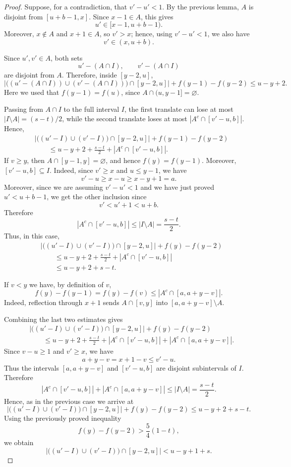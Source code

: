 \documentclass[11pt,reqno]{amsart}
\theoremstyle{definition}
\def\F#1{f(#1)}
\begin{document}
\begin{proof}
Suppose, for a contradiction, that $v'-u'<1$. By the previous lemma, $A$ is
disjoint from $[u+b-1,x]$. Since $x-1\in A$, this gives
$$
    u'\in [x-1,u+b-1).
$$
Moreover, $x\notin A$ and $x+1\in A$, so $v'>x$; hence, using
$v'-u'<1$, we also have
$$
    v'\in (x,u+b).
$$

Since $u',v'\in A$, both sets
$$
    u'-(A\cap I),
    \qquad
    v'-(A\cap I)
$$
are disjoint from $A$. Therefore, inside $[y-2,u]$,
$$
    \left| \bigl((u'-(A\cap I))\cup(v'-(A\cap I))\bigr)\cap[y-2,u]\right|
    +\F{y-1}-\F{y-2}
    \leq u-y+2.
$$
Here we used that $\F{y-1}=\F{u}$, since $A\cap(u,y-1]=\varnothing$.

Passing from $A\cap I$ to the full interval $I$, the first translate can lose
at most $|I\setminus A|=(s-t)/2$, while the second translate loses at most
$|A^c\cap[v'-u,b]|$. Hence,  
$$
\begin{aligned}
    &\left| \bigl((u'-I)\cup(v'-I)\bigr)\cap[y-2,u]\right|
    +\F{y-1}-\F{y-2} \\
    &\qquad\leq
    u-y+2+\frac{s-t}{2}+|A^c\cap[v'-u,b]|.
\end{aligned}
$$
If $v\geq y$, then $A\cap[y-1,y]=\varnothing$, and hence $\F{y}=\F{y-1}$. Moreover, $[v'-u,b]\subseteq I$. Indeed, since $v'\geq x$ and
$u\leq y-1$, we have
$$
    v'-u\geq x-u\geq x-y+1=a.
$$
Moreover, since we are assuming $v'-u'<1$ and we have just proved
$u'<u+b-1$, we get the other inclusion since
$$
    v'<u'+1<u+b.
$$
Therefore
$$
    |A^c\cap [v'-u,b]|
    \leq |I\setminus A|
    =
    \frac{s-t}{2}.
$$
Thus, in this case,
$$
\begin{aligned}
    &\left|
        \bigl((u'-I)\cup(v'-I)\bigr)\cap [y-2,u]
    \right|
    +\F{y}-\F{y-2}  \\
    &\qquad\leq
    u-y+2+\frac{s-t}{2}+|A^c\cap [v'-u,b]|  \\
    &\qquad\leq
    u-y+2+s-t.
\end{aligned}
$$

If $v<y$ we have, by definition of $v$,
$$
    \F{y}-\F{y-1}=\F{y}-\F{v}\leq |A^c\cap[a,a+y-v]|.
$$
Indeed, reflection through $x+1$ sends $A\cap[v,y]$ into
$[a,a+y-v]\setminus A$.

Combining the last two estimates gives
$$
\begin{aligned}
    &\left| \bigl((u'-I)\cup(v'-I)\bigr)\cap[y-2,u]\right|
    +\F{y}-\F{y-2} \\
    &\qquad\leq
    u-y+2+\frac{s-t}{2}
    +|A^c\cap[v'-u,b]|+|A^c\cap[a,a+y-v]|.
\end{aligned}
$$
Since $v-u\geq1$ and $v'\geq x$, we have
$$
    a+y-v=x+1-v\leq v'-u.
$$
Thus the intervals $[a,a+y-v]$ and $[v'-u,b]$ are disjoint subintervals of
$I$. Therefore
$$
    |A^c\cap[v'-u,b]|+|A^c\cap[a,a+y-v]|
    \leq |I\setminus A|
    =
    \frac{s-t}{2}.
$$
Hence, as in the previous case we arrive at
$$
    \left| \bigl((u'-I)\cup(v'-I)\bigr)\cap[y-2,u]\right|
    +\F{y}-\F{y-2}
    \leq u-y+2+s-t.
$$
Using the previously proved inequality
$$
    \F{y}-\F{y-2}>\frac54(1-t),
$$
we obtain
$$
    \left| \bigl((u'-I)\cup(v'-I)\bigr)\cap[y-2,u]\right|
    < u-y+1+s.
$$


\end{proof}
\end{document}
